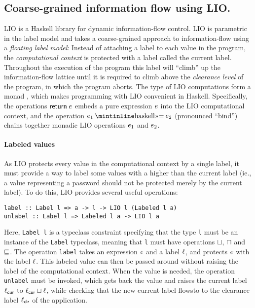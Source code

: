 \subsection{Coarse-grained information flow using LIO.}
LIO \cite{SRMMlio} is a Haskell library for dynamic information-flow control. LIO is parametric in the label model and takes a coarse-grained approach to information-flow using a \emph{floating label model}: Instead of attaching a label to each value in the program, the \emph{computational context} is protected with a label called the current label. Throughout the execution of the program this label will ``climb'' up the information-flow lattice until it is required to climb above the \emph{clearance level} of the program, in which the program aborts. The type of LIO computations form a monad \cite{Wadler:1995:MFP:647698.734146}, which makes programming with LIO convenient in Haskell. Specifically, the operations $\mathsf{return}\;e$ embeds a pure expression $e$ into the LIO computational context, and the operation $\bind{\expr_1}{\expr_2}$ (pronounced ``bind'') chains together monadic LIO operations $e_1$ and $e_2$.

\paragraph{Labeled values}
As LIO protects every value in the computational context by a single label, it must provide a way to label some values with a higher than the current label (ie., a value representing a password should not be protected merely by the current label). To do this, LIO provides several useful operations:
\begin{verbatim}
label :: Label l => a -> l -> LIO l (Labeled l a)
unlabel :: Label l => Labeled l a -> LIO l a
\end{verbatim}
Here, \texttt{Label l} is a typeclass constraint specifying that the type \texttt{l} must be an instance of the \texttt{Label} typeclass, meaning that \texttt{l} must have operations $\sqcup$, $\sqcap$ and $\sqsubseteq$. The operation \texttt{label} takes an expression $e$ and a label $\ell$, and protects $e$ with the label $\ell$. This labeled value can then be passed around without raising the label of the computational context. When the value is needed, the operation \texttt{unlabel} must be invoked, which gets back the value and raises the current label $\ell_{\mathsf{cur}}$ to $\ell_{\mathsf{cur}} \sqcup \ell$, while checking that the new current label flowsto to the clearance label $\ell_{\mathsf{clr}}$ of the application.

